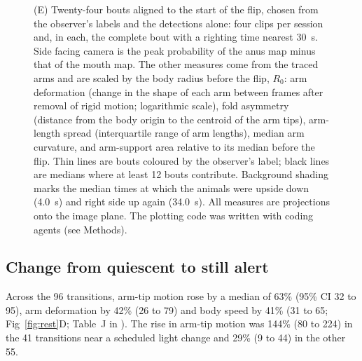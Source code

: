 \begin{figure}[!ht]
{(E) Twenty-four bouts aligned to the start of the flip, chosen from the observer's labels and the detections alone: four clips per session and, in each, the complete bout with a righting time nearest 30~s. Side facing camera is the peak probability of the anus map minus that of the mouth map. The other measures come from the traced arms and are scaled by the body radius before the flip, $R_0$: arm deformation (change in the shape of each arm between frames after removal of rigid motion; logarithmic scale), fold asymmetry (distance from the body origin to the centroid of the arm tips), arm-length spread (interquartile range of arm lengths), median arm curvature, and arm-support area relative to its median before the flip. Thin lines are bouts coloured by the observer's label; black lines are medians where at least 12 bouts contribute. Background shading marks the median times at which the animals were upside down (4.0~s) and right side up again (34.0~s). All measures are projections onto the image plane. The plotting code was written with coding agents (see Methods).}
\label{fig:righting}
\end{figure}

\subsection*{Change from quiescent to still alert}

Across the 96 transitions, arm-tip motion rose by a median of 63\% (95\% CI 32 to 95), arm deformation by 42\% (26 to 79) and body speed by 41\% (31 to 65; Fig~\ref{fig:rest}D; Table~J in ).
The rise in arm-tip motion was 144\% (80 to 224) in the 41 transitions near a scheduled light change and 29\% (9 to 44) in the other 55.

